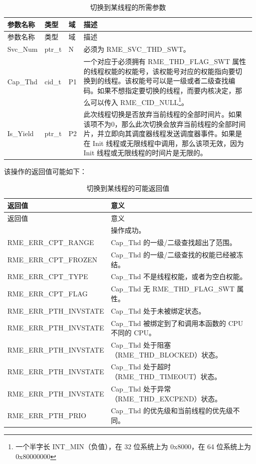 \begin{xltabular}{\textwidth}{@{}>{\hsize\raggedright\arraybackslash}X>{\hsize\raggedright\arraybackslash}X>{\hsize\raggedright\arraybackslash}X>{\hsize\raggedright\arraybackslash}X@{}}
\caption{切换到某线程的所需参数}\label{tab:4-36-switch-to-thread-parameters}\\
\toprule
参数名称 & 类型 & 域 & 描述\tabularnewline
\endfirsthead
\toprule
参数名称 & 类型 & 域 & 描述\tabularnewline
\midrule
\endhead
\bottomrule
\endlastfoot
Svc\_Num & ptr\_t & N & 必须为 RME\_SVC\_THD\_SWT。\tabularnewline
Cap\_Thd & cid\_t & P1 &
一个对应于必须拥有 RME\_THD\_FLAG\_SWT 属性的线程权能的权能号，该权能号对应的权能指向要切换到的线程。该权能号可以是一级或者二级查找编码。如果不想指定要切换的线程，而要内核决定，那么可以传入 RME\_CID\_NULL\footnote{一个半字长 INT\_MIN（负值），在 32 位系统上为 0x8000，在 64 位系统上为 0x80000000}。\tabularnewline
Is\_Yield & ptr\_t & P2 &
此次线程切换是否放弃当前线程的全部时间片。如果该项不为0，那么此次切换会放弃当前线程的全部时间片，并立即向其调度器线程发送调度器事件。如果是在 Init 线程或无限线程中调用，那么该项无效，因为 Init 线程或无限线程的时间片是无限的。\tabularnewline
\end{xltabular}

该操作的返回值可能如下：

\begin{xltabular}{\textwidth}{@{}>{\hsize\raggedright\arraybackslash}X>{\hsize\raggedright\arraybackslash}X@{}}
\caption{切换到某线程的可能返回值}\label{tab:4-37-switch-to-thread-return-values}\\
\toprule
返回值 & 意义\tabularnewline
\endfirsthead
\toprule
返回值 & 意义\tabularnewline
\midrule
\endhead
\bottomrule
{} & 操作成功。\tabularnewline
    RME\_ERR\_CPT\_RANGE & Cap\_Thd 的一级/二级查找超出了范围。\tabularnewline
    RME\_ERR\_CPT\_FROZEN & Cap\_Thd 的一级/二级查找的权能已经被冻结。\tabularnewline
    RME\_ERR\_CPT\_TYPE & Cap\_Thd 不是线程权能，或者为空白权能。\tabularnewline
    RME\_ERR\_CPT\_FLAG & Cap\_Thd 无 RME\_THD\_FLAG\_SWT 属性。\tabularnewline
    RME\_ERR\_PTH\_INVSTATE & Cap\_Thd 处于未被绑定状态。\tabularnewline
    RME\_ERR\_PTH\_INVSTATE & Cap\_Thd 被绑定到了和调用本函数的 CPU 不同的 CPU。\tabularnewline
    RME\_ERR\_PTH\_INVSTATE & Cap\_Thd 处于阻塞（RME\_THD\_BLOCKED）状态。\tabularnewline
    RME\_ERR\_PTH\_INVSTATE & Cap\_Thd 处于超时（RME\_THD\_TIMEOUT）状态。\tabularnewline
    RME\_ERR\_PTH\_INVSTATE & Cap\_Thd 处于异常（RME\_THD\_EXCPEND）状态。\tabularnewline
    RME\_ERR\_PTH\_PRIO & Cap\_Thd 的优先级和当前线程的优先级不同。\tabularnewline
\end{xltabular}

